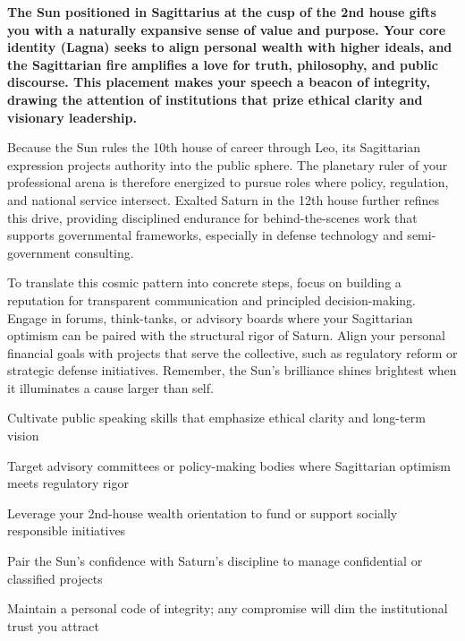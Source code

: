 {\fontsize{9.5}{13.8}\selectfont\bfseries\color{DeepSlate} The Sun positioned in Sagittarius at the cusp of the 2nd house gifts you with a naturally expansive sense of value and purpose. Your core identity (Lagna) seeks to align personal wealth with higher ideals, and the Sagittarian fire amplifies a love for truth, philosophy, and public discourse. This placement makes your speech a beacon of integrity, drawing the attention of institutions that prize ethical clarity and visionary leadership.}\par\vspace{2mm}

{\fontsize{9}{13}\selectfont Because the Sun rules the 10th house of career through Leo, its Sagittarian expression projects authority into the public sphere. The planetary ruler of your professional arena is therefore energized to pursue roles where policy, regulation, and national service intersect. Exalted Saturn in the 12th house further refines this drive, providing disciplined endurance for behind-the-scenes work that supports governmental frameworks, especially in defense technology and semi-government consulting.}\par\vspace{1.8mm}

{\fontsize{9}{13}\selectfont To translate this cosmic pattern into concrete steps, focus on building a reputation for transparent communication and principled decision-making. Engage in forums, think-tanks, or advisory boards where your Sagittarian optimism can be paired with the structural rigor of Saturn. Align your personal financial goals with projects that serve the collective, such as regulatory reform or strategic defense initiatives. Remember, the Sun's brilliance shines brightest when it illuminates a cause larger than self.}\par\vspace{1.8mm}

\begin{diamondlist}
  \item {\fontsize{8.5}{12}\selectfont Cultivate public speaking skills that emphasize ethical clarity and long-term vision}
  \item {\fontsize{8.5}{12}\selectfont Target advisory committees or policy-making bodies where Sagittarian optimism meets regulatory rigor}
  \item {\fontsize{8.5}{12}\selectfont Leverage your 2nd-house wealth orientation to fund or support socially responsible initiatives}
  \item {\fontsize{8.5}{12}\selectfont Pair the Sun's confidence with Saturn's discipline to manage confidential or classified projects}
  \item {\fontsize{8.5}{12}\selectfont Maintain a personal code of integrity; any compromise will dim the institutional trust you attract}
\end{diamondlist}

